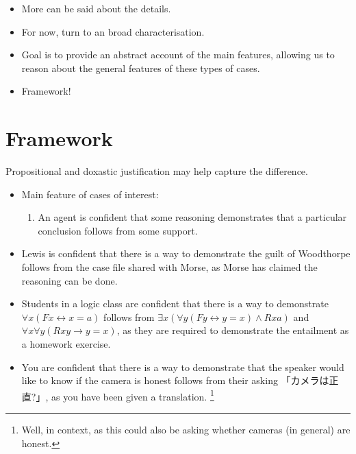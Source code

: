 \documentclass[10pt]{article}
\begin{document}
\begin{itemize}
\item More can be said about the details.
\item For now, turn to an broad characterisation.
\item Goal is to provide an abstract account of the main features, allowing us to reason about the general features of these types of cases.
\item Framework!
\end{itemize}

\newpage


\section{Framework}
\label{sec:framework-1}

\begin{note}
  Propositional and doxastic justification may help capture the difference.
\end{note}

\begin{itemize}
\item Main feature of cases of interest:
  \begin{enumerate}
  \item An agent is confident that some reasoning demonstrates that a particular conclusion follows from some support.
  \end{enumerate}
\end{itemize}

\begin{itemize}
\item Lewis is confident that there is a way to demonstrate the guilt of Woodthorpe follows from the case file shared with Morse, as Morse has claimed the reasoning can be done.
\item Students in a logic class are confident that there is a way to demonstrate \(\forall x(Fx \leftrightarrow x = a)\) follows from \(\exists x(\forall y(Fy \leftrightarrow y = x) \land Rxa)\) and \(\forall x\forall y(Rxy \rightarrow y = x)\), as they are required to demonstrate the entailment as a homework exercise.
\item You are confident that there is a way to demonstrate that the speaker would like to know if the camera is honest follows from their asking 「カメラは正直?」, as you have been given a translation.\nolinebreak
  \footnote{Well, in context, as this could also be asking whether cameras (in general) are honest.}
\end{itemize}
\end{document}
